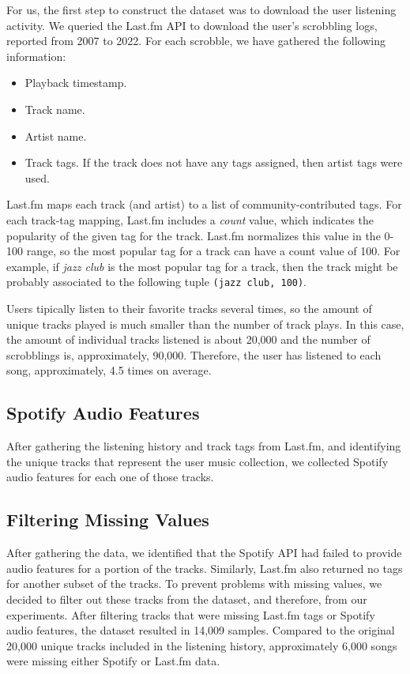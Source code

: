 \documentclass[sn-mathphys]{sn-jnl}%
\theoremstyle{thmstyleone}%
\theoremstyle{thmstyletwo}%
\theoremstyle{thmstylethree}%
\begin{document}
For us, the first step to construct the dataset was to download the user listening activity.
We queried the Last.fm API to download the user{'}s scrobbling logs, reported from 2007 to 2022.
For each scrobble, we have gathered the following information:

\begin{itemize}
\item Playback timestamp.
\item Track name.
\item Artist name.
\item Track tags. If the track does not have any tags assigned,
then artist tags were used.
\end{itemize}

Last.fm maps each track (and artist) to a list of community-contributed tags.
For each track-tag mapping, Last.fm includes
a \emph{count} value, which indicates the popularity of the given tag for the track.
Last.fm normalizes this value in the 0-100 range, so the most popular tag for a track can have a
count value of 100.
For example, if \emph{jazz club} is the most popular tag for a track,
then the track might be probably
associated to the following tuple \verb|(jazz club, 100)|.

Users tipically listen to their favorite tracks several times,
so the amount of unique tracks played is much smaller
than the number of track plays. In this case, the amount of
individual tracks listened is about 20,000 and the number of scrobblings is, approximately, 90,000.
Therefore, the user has listened to each song, approximately, 4.5 times on average.


\subsection{Spotify Audio Features}

After gathering the listening history and track tags from Last.fm, and identifying the unique
tracks that represent the user music collection, we
collected Spotify audio features for each one of those tracks.

\subsection{Filtering Missing Values}

After gathering the data, we identified that the Spotify API had failed to provide audio features for a portion of the tracks.
Similarly, Last.fm also returned no tags for another subset of the tracks.
To prevent problems with missing values, we decided to filter out these tracks from the dataset, and therefore, from our experiments.
After filtering tracks that were missing Last.fm tags or Spotify audio features,
the dataset resulted in 14,009 samples.
Compared to the original 20,000 unique tracks included in the listening history, approximately 6,000 songs were missing either Spotify or Last.fm data.
\end{document}
